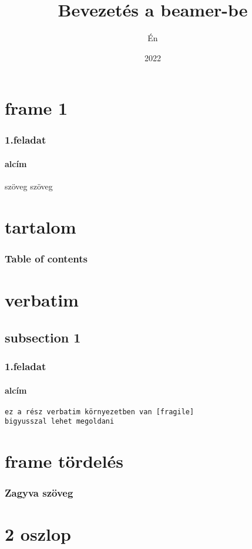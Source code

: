 \documentclass[12pt,aspectratoio=169]{beamer}
\title{Bevezetés a beamer-be}
\author{Én}
\date{2022}
\begin{document}
\section{frame 1}
\frame{\titlepage}

\begin{frame}
\frametitle{1.feladat}
\framesubtitle{alcím}
szöveg szöveg 
\end{frame}

\section{tartalom}
\begin{frame}
\frametitle{Table of contents}
\tableofcontents
\end{frame}


\section{verbatim}
\subsection{subsection 1}
\begin{frame}[fragile]
\frametitle{1.feladat}
\framesubtitle{alcím}
\begin{verbatim}
ez a rész verbatim környezetben van [fragile]
bigyusszal lehet megoldani
\end{verbatim}
\end{frame}

\section{frame tördelés}
\begin{frame}[allowframebreaks]
\frametitle{Zagyva szöveg}
\lipsum[1-2]
\end{frame}

\section{2 oszlop}
\end{document}

